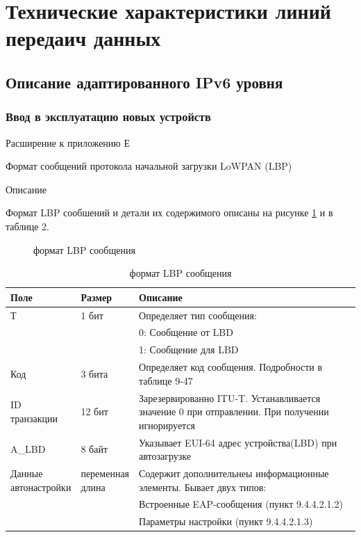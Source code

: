 \section{Технические характеристики линий передаич данных} %

\subsection{Описание адаптированного IPv6 уровня} %
 
\subsubsection{Ввод в эксплуатацию новых устройств} %

Расширение к приложению Е %

Формат сообщений протокола начальной загрузки LoWPAN (LBP) %

Описание %

Формат LBP сообшений и детали их содержимого описаны на рисунке \ref{img:9-22} и в таблице 2. %

\begin{figure}[h]
 \label{img:9-22}
 \caption{формат LBP сообщения}
\end{figure}

\begin{longtable}[\textwidth]{|p{0.2\linewidth}|p{0.15\linewidth}|p{0.65\linewidth}|}
\caption{формат LBP сообщения} \\ %
\hline
Поле & Размер & Описание \\ \hline
Т & 1 бит & Определяет тип сообщения: \\
& & 0: Сообщение от LBD \\
& & 1: Сообщение для LBD \\ \hline
Код & 3 бита & Определяет код сообщения. Подробности в таблице 9-47 \\ \hline
ID транзакции & 12 бит & Зарезервированно ITU-T. Устанавливается значение 0 при отправлении. При получении игнорируется \\ \hline
A\_LBD & 8 байт & Указывает EUI-64 адрес устройства(LBD)  при автозагрузке\\ \hline
Данные автонастройки & переменная длина & Содержит дополнительнеы информационные элементы. Бывает двух типов: \\
& & Встроенные EAP-сообщения (пункт 9.4.4.2.1.2) \\
& & Параметры настройки (пункт 9.4.4.2.1.3) \\ \hline
\end{longtable}

